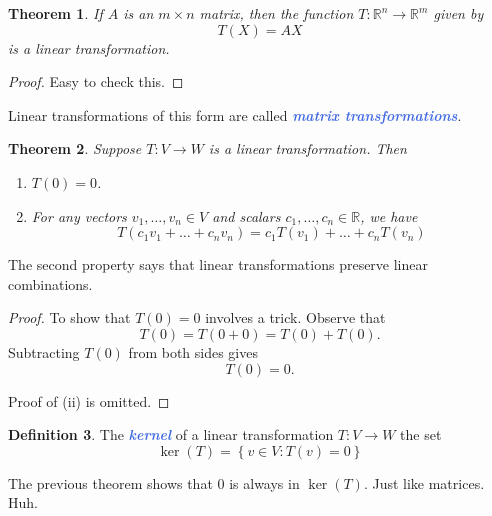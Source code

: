 \documentclass[10pt]{article}
\newcommand{\demph}[1]{\textcolor{RoyalBlue}{\textbf{\slshape #1}}} %
\newtheorem{theorem}{Theorem}
\theoremstyle{definition}
\newtheorem{definition}[theorem]{Definition}
\newcommand{\R}{\mathbb{R}}           %
\begin{document}
\begin{theorem}
  If $A$ is an $m\times n$ matrix, then the function $T: \R^{n}\to \R^{m}$
  given by
  \begin{equation*}
    T(X) = AX
  \end{equation*}
  is a linear transformation.
\end{theorem}
\begin{proof}
  Easy to check this.
\end{proof}

Linear transformations of this form are called \demph{matrix transformations}.


\begin{theorem}
  Suppose $T:V \to W$ is a linear transformation. Then
  \begin{enumerate}[label=(\roman*)]
    \item $T(0)=0$.
    \item For any vectors $v_{1},\ldots,v_{n}\in V$ and scalars
    $c_{1},\ldots,c_{n}\in \R$, we have
    \begin{equation*}
      T(c_{1}v_{1}+\ldots+c_{n}v_{n})=
      c_{1}T(v_{1})+\ldots+c_{n}T(v_{n})
    \end{equation*}
  \end{enumerate}
\end{theorem}
The second property says that linear transformations preserve linear
combinations.
\begin{proof}
  To show that $T(0)=0$ involves a trick. Observe that
  \begin{equation*}
    T(0) = T(0+0) = T(0)+T(0).
  \end{equation*}
  Subtracting $T(0)$ from both sides gives
  \begin{equation*}
    T(0)=0.
  \end{equation*}

  Proof of (ii) is omitted.
\end{proof}

\begin{definition}
  The \demph{kernel} of a linear transformation $T:V \to W$ the set
  \begin{equation*}
    \ker(T) = \left\{v\in V : T(v) = 0\right\} 
  \end{equation*}
\end{definition}
The previous theorem shows that $0$ is always in $\ker(T)$. Just like
matrices. Huh.
\end{document}

